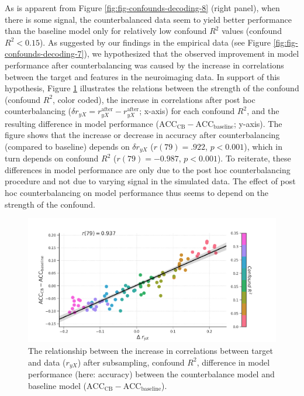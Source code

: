 \documentclass[12pt,american,a4paper,oneside,]{memoir} %
\begin{document}
As is apparent from Figure \ref{fig:fig-confounds-decoding-8} (right panel), when there is some signal, the counterbalanced data seem to yield better performance than the baseline model only for relatively low confound \(R^2\) values (confound \(R^2 < 0.15\)). As suggested by our findings in the empirical data (see Figure \ref{fig:fig-confounds-decoding-7}), we hypothesized that the observed improvement in model performance after counterbalancing was caused by the increase in correlations between the target and features in the neuroimaging data. In support of this hypothesis, Figure \ref{fig:fig-confounds-decoding-9} illustrates the relations between the strength of the confound (confound \(R^2\), color coded), the increase in correlations after post hoc counterbalancing (\(\delta r_{yX} = r_{yX}^{\mathrm{after}} - r_{yX}^{\mathrm{after}}\); x-axis) for each confound \(R^2\), and the resulting difference in model performance (\(\mathrm{ACC}_{\mathrm{CB}} - \mathrm{ACC}_{\mathrm{baseline}}\); y-axis). The figure shows that the increase or decrease in accuracy after counterbalancing (compared to baseline) depends on \(\delta r_{yX}\) (\(r(79) = .922\), \(p < 0.001\)), which in turn depends on confound \(R^2\) (\(r(79) = -0.987\), \(p < 0.001\)). To reiterate, these differences in model performance are only due to the post hoc counterbalancing procedure and not due to varying signal in the simulated data. The effect of post hoc counterbalancing on model performance thus seems to depend on the strength of the confound.

\begin{figure}
\centering
\includegraphics{_bookdown_files/confounds-decoding-files/figures/figure_9.pdf}
\caption{\label{fig:fig-confounds-decoding-9}The relationship between the increase in correlations between target and data (\(r_{yX}\)) after subsampling, confound \(R^2\), difference in model performance (here: accuracy) between the counterbalance model and baseline model (\(\mathrm{ACC}_{\mathrm{CB}} - \mathrm{ACC}_{\mathrm{baseline}}\)).}
\end{figure}
\end{document}
